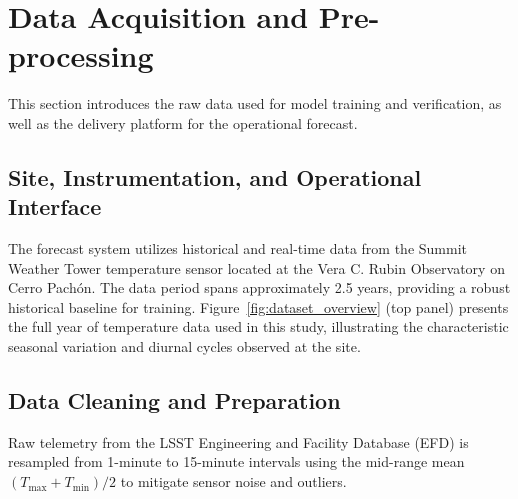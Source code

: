 \documentclass[twocolumn]{aastex631}
\begin{document}

\section{Data Acquisition and Pre-processing}
\label{sec:data}

This section introduces the raw data used for model training and verification, as well as the delivery platform for the operational forecast.

\subsection{Site, Instrumentation, and Operational Interface}
\label{sec:data:interface}
The forecast system utilizes historical and real-time data from the Summit Weather Tower temperature sensor located at the Vera C. Rubin Observatory on Cerro Pachón. The data period spans approximately 2.5 years, providing a robust historical baseline for training. Figure~\ref{fig:dataset_overview} (top panel) presents the full year of temperature data used in this study, illustrating the characteristic seasonal variation and diurnal cycles observed at the site.

\subsection{Data Cleaning and Preparation}
\label{sec:data:cleaning}
Raw telemetry from the LSST Engineering and Facility Database (EFD) is resampled from 1-minute to 15-minute intervals using the mid-range mean $(T_{\text{max}} + T_{\text{min}})/2$ to mitigate sensor noise and outliers. 
\end{document}
